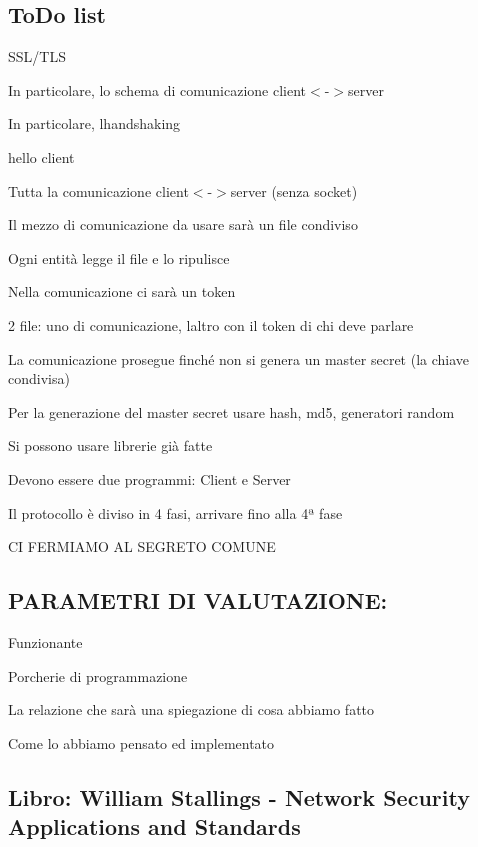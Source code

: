 \subsection*{To\+Do list}


\begin{DoxyItemize}
\item S\+S\+L/\+T\+LS
\item In particolare, lo schema di comunicazione client$<$-\/$>$server
\item In particolare, l\textquotesingle{}handshaking
\item [hello client]
\item Tutta la comunicazione client$<$-\/$>$server (senza socket)
\item Il mezzo di comunicazione da usare sarà un file condiviso
\item Ogni entità legge il file e lo ripulisce
\item Nella comunicazione ci sarà un token
\item 2 file\+: uno di comunicazione, l\textquotesingle{}altro con il token di chi deve parlare
\item La comunicazione prosegue finché non si genera un master secret (la chiave condivisa)
\item Per la generazione del master secret usare hash, md5, generatori random
\item Si possono usare librerie già fatte
\item Devono essere due programmi\+: Client e Server
\item Il protocollo è diviso in 4 fasi, arrivare fino alla 4ª fase
\item CI F\+E\+R\+M\+I\+A\+MO AL S\+E\+G\+R\+E\+TO C\+O\+M\+U\+NE
\end{DoxyItemize}

\subsection*{P\+A\+R\+A\+M\+E\+T\+RI DI V\+A\+L\+U\+T\+A\+Z\+I\+O\+NE\+:}


\begin{DoxyItemize}
\item Funzionante
\item Porcherie di programmazione
\item La relazione che sarà una spiegazione di cosa abbiamo fatto
\item Come lo abbiamo pensato ed implementato
\end{DoxyItemize}

\subsection*{Libro\+: William Stallings -\/ Network Security Applications and Standards}